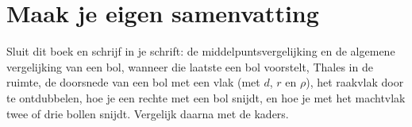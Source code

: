 
\begin{oefeningen}






\end{oefeningen}


\ifzelfstudie
\section*{Maak je eigen samenvatting}
Sluit dit boek en schrijf in je schrift: de middelpuntsvergelijking en de algemene vergelijking van een bol, wanneer die laatste een bol voorstelt, Thales in de ruimte, de doorsnede van een bol met een vlak (met $d$, $r$ en $\rho$), het raakvlak door te ontdubbelen, hoe je een rechte met een bol snijdt, en hoe je met het machtvlak twee of drie bollen snijdt. Vergelijk daarna met de kaders.
\fi
